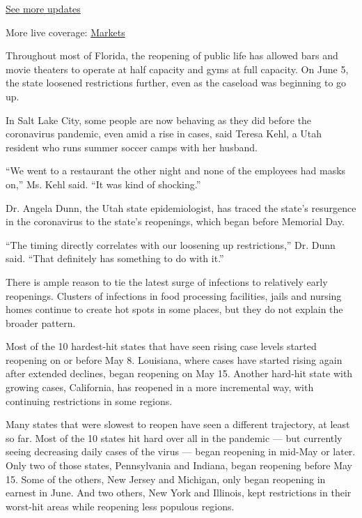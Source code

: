 \href{https://www.nytimes.com/2020/08/07/world/covid-19-news.html?action=click\&pgtype=Article\&state=default\&region=MAIN_CONTENT_1\&context=storylines_live_updates}{See
more updates}

More live coverage:
\href{https://www.nytimes.com/live/2020/08/07/business/stock-market-today-coronavirus?action=click\&pgtype=Article\&state=default\&region=MAIN_CONTENT_1\&context=storylines_live_updates}{Markets}

Throughout most of Florida, the reopening of public life has allowed
bars and movie theaters to operate at half capacity and gyms at full
capacity. On June 5, the state loosened restrictions further, even as
the caseload was beginning to go up.

In Salt Lake City, some people are now behaving as they did before the
coronavirus pandemic, even amid a rise in cases, said Teresa Kehl, a
Utah resident who runs summer soccer camps with her husband.

``We went to a restaurant the other night and none of the employees had
masks on,'' Ms. Kehl said. ``It was kind of shocking.''

Dr. Angela Dunn, the Utah state epidemiologist, has traced the state's
resurgence in the coronavirus to the state's reopenings, which began
before Memorial Day.

``The timing directly correlates with our loosening up restrictions,''
Dr. Dunn said. ``That definitely has something to do with it.''

There is ample reason to tie the latest surge of infections to
relatively early reopenings. Clusters of infections in food processing
facilities, jails and nursing homes continue to create hot spots in some
places, but they do not explain the broader pattern.

Most of the 10 hardest-hit states that have seen rising case levels
started reopening on or before May 8. Louisiana, where cases have
started rising again after extended declines, began reopening on May 15.
Another hard-hit state with growing cases, California, has reopened in a
more incremental way, with continuing restrictions in some regions.

Many states that were slowest to reopen have seen a different
trajectory, at least so far. Most of the 10 states hit hard over all in
the pandemic --- but currently seeing decreasing daily cases of the
virus --- began reopening in mid-May or later. Only two of those states,
Pennsylvania and Indiana, began reopening before May 15. Some of the
others, New Jersey and Michigan, only began reopening in earnest in
June. And two others, New York and Illinois, kept restrictions in their
worst-hit areas while reopening less populous regions.


